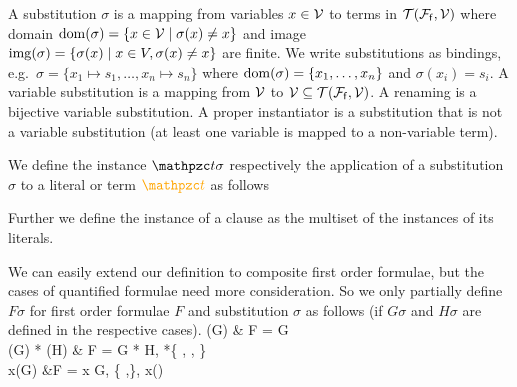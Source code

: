 


\begin{definition}\label{def:substitution}
	A {\myem substitution} $\sigma$ is a mapping from variables $x\in\mathcal{V}$ to terms in ${\mathcal{T}(\mathcal{F}_{\mathsf{f}},\mathcal{V})}$
	where {\myem domain }$\operatorname{dom}(\sigma) = \{ x\in\mathcal{V}\mid\sigma(x) \neq x \}$
	and image $\operatorname{img}(\sigma) =\{ \sigma(x) \mid x\in V, \sigma(x)\neq x \}$ are finite.
	We write substitutions as bindings, e.g.~$\sigma=\{ x_1\mapsto s_1,\ldots,x_n\mapsto s_n \}$
	where $\operatorname{dom}(\sigma)=\{ x_1,\ldots,x_n \}$ and $\sigma(x_i)=s_i$.
	A {\myem variable substitution} is a mapping from $\mathcal{V}$ to $\mathcal{V}\subseteq{\mathcal{T}(\mathcal{F}_{\mathsf{f}},\mathcal{V})}$.
	A {\myem renaming} is a bijective variable substitution.
	A {\myem proper instantiator} is a substitution that is not a variable substitution
	(at least one variable is mapped to a non-variable term).
\end{definition}
\begin{definition}
	We define the instance $\mct\sigma$
	respectively the application of a substitution $\sigma$ to a literal or term $\foxt$ as follows

\noindent Further we define the instance of a clause as the multiset of the instances of its literals.
\end{definition}

\begin{definition}
	We can easily extend our definition to composite first order formulae,
	but the cases of quantified formulae need more consideration.
	So we only partially define $F\sigma$ for first order formulae $F$ and substitution $\sigma$ as follows (if $G\sigma$ and $H\sigma$ are defined in the respective cases).
{
		\lnot(G\sigma) & F = \lnot G
		\\
		(G\sigma) * (H\sigma) & F = G * H, *\in \{ \land, \lor, \limp \}\\
		\quantify x(G\sigma) &F = \quantify x G,
		\quantify\in\{ \forall,\exists \},
		x\not\in\domain(\sigma)
	}
\end{definition}

